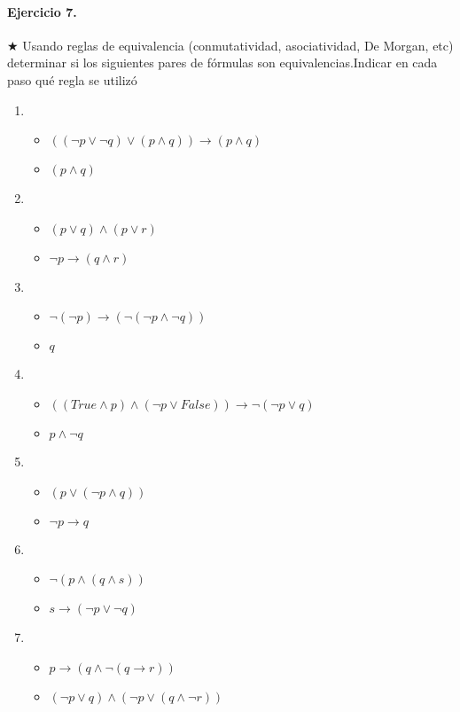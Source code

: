 \documentclass[a4paper]{article}
\begin{document}
\paragraph{
\textbf{Ejercicio 7.} }$\bigstar$ Usando reglas de equivalencia (conmutatividad, asociatividad, De Morgan, etc) determinar si los siguientes pares de fórmulas son equivalencias.Indicar en cada paso qué regla se utilizó


\begin{enumerate}[label=\alph*)]
\item \begin{itemize}
\item $ ((\neg p\vee \neg q)\vee (p\wedge q))\rightarrow (p\wedge q)$
\item $ (p\wedge q)$
\end{itemize}
\item \begin{itemize}
\item $(p\vee q)\wedge (p\vee r)$
\item $ \neg p \rightarrow (q\wedge r)$
\end{itemize}
\item \begin{itemize}
\item $ \neg (\neg p)\rightarrow (\neg (\neg p \wedge \neg q))$
\item $ q $
\end{itemize}
\item \begin{itemize}
\item $((True \wedge p) \wedge (\neg p \vee False))\rightarrow \neg (\neg p\vee q)$
\item $ p \wedge \neg q$
\end{itemize}
\item \begin{itemize}
\item $ (p \vee (\neg p \wedge q))$
\item $ \neg p \rightarrow q$
\end{itemize}
\item \begin{itemize}
\item $ \neg (p \wedge (q \wedge s))$
\item $ s \rightarrow (\neg p \vee \neg q)$
\end{itemize}
\item \begin{itemize}
\item $ p \rightarrow (q \wedge \neg (q \rightarrow r))$
\item $ (\neg p \vee q)\wedge (\neg p \vee (q \wedge \neg r))$
\end{itemize}
\end{enumerate}
\end{document}
